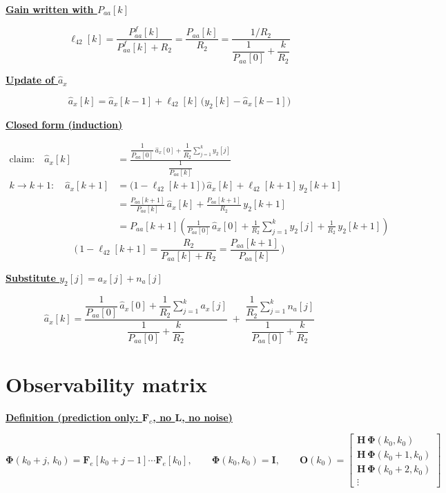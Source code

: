 \documentclass[11pt,a4paper]{ctexart}
\newcommand{\hd}[1]{\par\medskip\noindent\underline{\textbf{#1}}\par\nobreak\vspace{0.2ex}}
\begin{document}
\hd{Gain written with $P_{aa}[k]$}
\[
\ell_{42}[k] = \frac{P^f_{aa}[k]}{P^f_{aa}[k] + R_2} = \frac{P_{aa}[k]}{R_2}
= \frac{1/R_2}{\dfrac{1}{P_{aa}[0]} + \dfrac{k}{R_2}}
\]

\hd{Update of $\hat a_x$}
\[
\hat a_x[k] = \hat a_x[k-1] + \ell_{42}[k]\,\big(y_2[k] - \hat a_x[k-1]\big)
\]

\hd{Closed form (induction)}
\[
\begin{aligned}
\text{claim:}\quad \hat a_x[k] &= \frac{\dfrac{1}{P_{aa}[0]}\,\hat a_x[0] + \dfrac{1}{R_2}\sum_{j=1}^{k} y_2[j]}{\dfrac{1}{P_{aa}[k]}} \\[0.8ex]
k \to k+1:\quad \hat a_x[k+1] &= \big(1 - \ell_{42}[k+1]\big)\,\hat a_x[k] + \ell_{42}[k+1]\,y_2[k+1] \\
&= \frac{P_{aa}[k+1]}{P_{aa}[k]}\,\hat a_x[k] + \frac{P_{aa}[k+1]}{R_2}\,y_2[k+1] \\
&= P_{aa}[k+1]\left(\frac{1}{P_{aa}[0]}\,\hat a_x[0] + \frac{1}{R_2}\sum_{j=1}^{k} y_2[j] + \frac{1}{R_2}\,y_2[k+1]\right)
\end{aligned}
\]
\[
\Big(\,1 - \ell_{42}[k+1] = \frac{R_2}{P_{aa}[k] + R_2} = \frac{P_{aa}[k+1]}{P_{aa}[k]}\,\Big)
\]

\hd{Substitute $y_2[j] = a_x[j] + n_a[j]$}
\[
\hat a_x[k] = \frac{\dfrac{1}{P_{aa}[0]}\,\hat a_x[0] + \dfrac{1}{R_2}\sum_{j=1}^{k} a_x[j]}{\dfrac{1}{P_{aa}[0]} + \dfrac{k}{R_2}}
\;+\; \frac{\dfrac{1}{R_2}\sum_{j=1}^{k} n_a[j]}{\dfrac{1}{P_{aa}[0]} + \dfrac{k}{R_2}}
\]

\section{Observability matrix}

\hd{Definition (prediction only: $\mathbf{F}_e$, no $\mathbf{L}$, no noise)}
\[
\bm{\Phi}(k_0+j,\,k_0) = \mathbf{F}_e[k_0+j-1]\cdots\mathbf{F}_e[k_0], \qquad \bm{\Phi}(k_0,k_0) = \mathbf{I}, \qquad
\mathbf{O}(k_0) =
\begin{bmatrix}
\mathbf{H}\,\bm{\Phi}(k_0,k_0) \\ \mathbf{H}\,\bm{\Phi}(k_0+1,k_0) \\ \mathbf{H}\,\bm{\Phi}(k_0+2,k_0) \\ \vdots
\end{bmatrix}
\]
\end{document}
